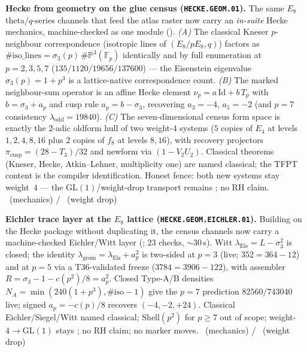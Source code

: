 \par\smallskip\noindent\textbf{Hecke from geometry on the glue census (\texttt{HECKE.GEOM.01}).}
The same $E_8$ theta/$q$-series channels that feed the atlas raster now carry an
\emph{in-suite} Hecke mechanics, machine-checked as one module
(). \emph{(A)} The classical Kneser $p$-neighbour
correspondence (isotropic lines of $(E_8/pE_8,q)$) factors as
$\#\mathrm{iso\_lines}=\sigma_3(p)\,\#\mathbb P^3(\mathbb F_p)$ identically and by full
enumeration at $p=2,3,5,7$ ($135/1120/19656/137600$) --- the Eisenstein eigenvalue
$\sigma_3(p)=1+p^3$ is a lattice-native correspondence count. \emph{(B)} The marked
neighbour-sum operator is an affine Hecke element
$\nu_p=a\,\mathrm{Id}+b\,T_p$ with $b=\sigma_3+a_p$ and cusp rule $a_p=b-\sigma_3$,
recovering $a_3=-4$, $a_5=-2$ (and $p=7$ consistency $\lambda_{\mathrm{odd}}=19840$).
\emph{(C)} The seven-dimensional census form space is exactly the $2$-adic oldform hull of
two weight-$4$ systems ($5$ copies of $E_4$ at levels $1,2,4,8,16$ plus $2$ copies of
$f_8$ at levels $8,16$), with recovery projectors
$\pi_{\mathrm{cusp}}=(28-T_3)/32$ and newform via $(1-V_2U_2)$.
Classical theorems (Kneser, Hecke, Atkin--Lehner, multiplicity one) are named classical;
the TFPT content is the compiler identification. Honest fence: both new systems stay
weight~$4$ --- the GL$(1)$/weight-drop transport remains \mO; no RH claim.
\mE\ (mechanics) / \mO\ (weight drop)


\par\smallskip\noindent\textbf{Eichler trace layer at the $E_8$ lattice
(\texttt{HECKE.GEOM.EICHLER.01}).}
Building on the Hecke package without duplicating it, the census channels now carry a
machine-checked Eichler/Witt layer (; $23$ checks,
$\sim30$\,s). Witt $\lambda_{\mathrm{Eis}}=L-\sigma_3^2$ is closed; the identity
$\lambda_{\mathrm{geom}}=\lambda_{\mathrm{Eis}}+a_p^2$ is two-sided at $p=3$ (live;
$352=364-12$) and at $p=5$ via a T36-validated freeze ($3784=3906-122$), with assembler
$R=\sigma_3-1-c(p^2)/8=a_p^2$. Closed Type-A/B densities
$N_A=\min(240(1+p^3),\#\mathrm{iso}-1)$ give the $p=7$ prediction $82560/743040$ live;
signed $a_p=-c(p)/8$ recovers $(-4,-2,+24)$. Classical Eichler/Siegel/Witt named classical;
$\mathrm{Shell}(p^2)$ for $p\ge7$ out of scope; weight-$4\to$GL$(1)$ stays \mO; no RH claim;
no marker moves.
\mE\ (mechanics) / \mO\ (weight drop)


